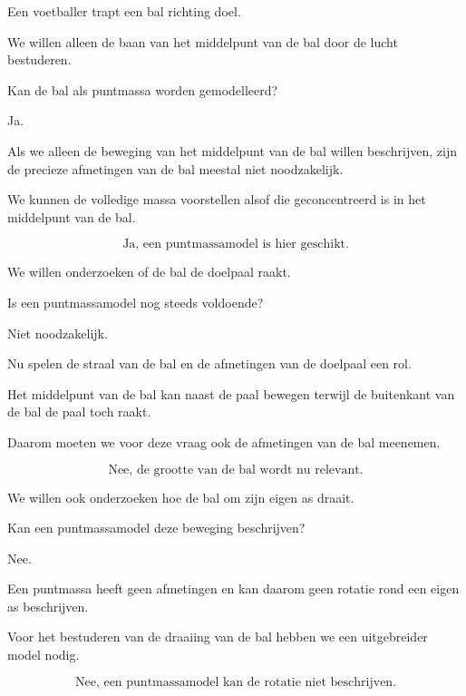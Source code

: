 \documentclass{ximera}
\begin{document}
  \begin{oefening}{\oefU}
  
  Een voetballer trapt een bal richting doel.
  
  \begin{question}
  We willen alleen de baan van het middelpunt van de bal door de lucht
  bestuderen.
  
  Kan de bal als puntmassa worden gemodelleerd?
  
  \begin{oplossing}
  Ja.
  
  Als we alleen de beweging van het middelpunt van de bal willen beschrijven,
  zijn de precieze afmetingen van de bal meestal niet noodzakelijk.
  
  We kunnen de volledige massa voorstellen alsof die geconcentreerd is in het
  middelpunt van de bal.
  
  \[
  \boxed{\text{Ja, een puntmassamodel is hier geschikt.}}
  \]
  \end{oplossing}
  \end{question}
  
  
  \begin{question}
  We willen onderzoeken of de bal de doelpaal raakt.
  
  Is een puntmassamodel nog steeds voldoende?
  
  \begin{oplossing}
  Niet noodzakelijk.
  
  Nu spelen de straal van de bal en de afmetingen van de doelpaal een rol.
  
  Het middelpunt van de bal kan naast de paal bewegen terwijl de buitenkant van
  de bal de paal toch raakt.
  
  Daarom moeten we voor deze vraag ook de afmetingen van de bal meenemen.
  
  \[
  \boxed{\text{Nee, de grootte van de bal wordt nu relevant.}}
  \]
  \end{oplossing}
  \end{question}
  
  
  \begin{question}
  We willen ook onderzoeken hoe de bal om zijn eigen as draait.
  
  Kan een puntmassamodel deze beweging beschrijven?
  
  \begin{oplossing}
  Nee.
  
  Een puntmassa heeft geen afmetingen en kan daarom geen rotatie rond een eigen
  as beschrijven.
  
  Voor het bestuderen van de draaiing van de bal hebben we een uitgebreider
  model nodig.
  
  \[
  \boxed{\text{Nee, een puntmassamodel kan de rotatie niet beschrijven.}}
  \]
  \end{oplossing}
  \end{question}
  
  \end{oefening}
  
\end{document}
